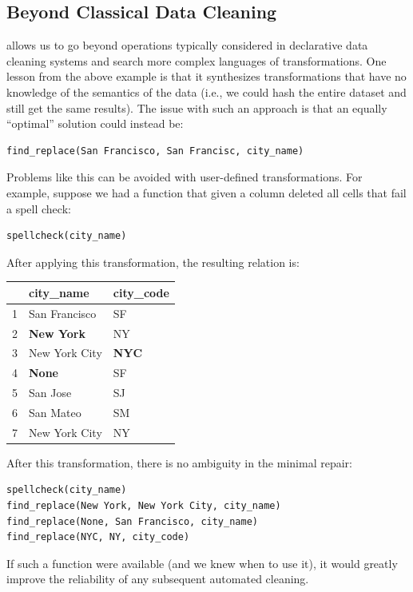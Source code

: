 \subsection{Beyond Classical Data Cleaning}
\sys allows us to go beyond operations typically considered in declarative data cleaning systems and search more complex languages of transformations.
One lesson from the above example is that it synthesizes transformations that have no knowledge of the semantics of the data (i.e., we could hash the entire dataset and still get the same results).
The issue with such an approach is that an equally ``optimal'' solution could instead be:
\begin{lstlisting}
find_replace(San Francisco, San Francisc, city_name)
\end{lstlisting}
Problems like this can be avoided with user-defined transformations.
For example, suppose we had a function that given a column deleted all cells that fail a spell check:
\begin{lstlisting}
spellcheck(city_name)
\end{lstlisting}
After applying this transformation, the resulting relation is:
\begin{table}[ht!]
\centering
\label{my-label}
\begin{tabular}{|l|l|l|}
\hline
\rowcolor[HTML]{000000} 
& {\color[HTML]{FFFFFF} city\_name}            & {\color[HTML]{FFFFFF} city\_code}   \\ \hline
1 & San Francisco                                & SF                                  \\ \hline
2& {\color[HTML]{FE0000} \textbf{New York}}     & NY                                  \\ \hline
3 & New York City                                & {\color[HTML]{FE0000} \textbf{NYC}} \\ \hline
4 & {\color[HTML]{005500} \textbf{None}} & SF                                  \\ \hline
5 & San Jose                                     & SJ                                  \\ \hline
6 & San Mateo                                    & SM                                  \\ \hline
7 & New York City                                & NY                                  \\ \hline
\end{tabular}
\end{table}
After this transformation, there is no ambiguity in the minimal repair:
\begin{lstlisting}
spellcheck(city_name)
find_replace(New York, New York City, city_name)
find_replace(None, San Francisco, city_name)
find_replace(NYC, NY, city_code)
\end{lstlisting}
If such a function were available (and we knew when to use it), it would greatly improve the reliability of any subsequent automated cleaning.

